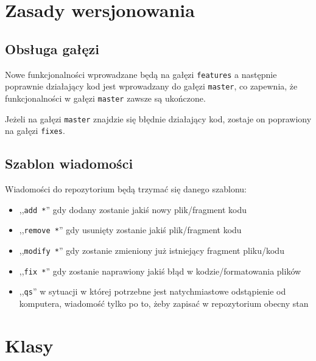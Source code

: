 \documentclass[a4paper,12pt]{report}
\begin{document}
\chapter{Zasady wersjonowania}
\thispagestyle{fancy}

\section{Obsługa gałęzi}
Nowe funkcjonalności wprowadzane będą na gałęzi \verb+features+ a następnie poprawnie działający kod jest wprowadzany do gałęzi \verb+master+, co zapewnia, że funkcjonalności w gałęzi \verb+master+ zawsze są ukończone.

Jeżeli na gałęzi \verb+master+ znajdzie się błędnie działający kod, zostaje on poprawiony na gałęzi \verb+fixes+.

\section{Szablon wiadomości}
Wiadomości do repozytorium będą trzymać się danego szablonu:
\begin{itemize}
    \item ,,\verb+add *+'' gdy dodany zostanie jakiś nowy plik/fragment kodu
    \item ,,\verb+remove *+'' gdy usunięty zostanie jakiś plik/fragment kodu
    \item ,,\verb+modify *+'' gdy zostanie zmieniony już istniejący fragment pliku/kodu
    \item ,,\verb+fix *+'' gdy zostanie naprawiony jakiś błąd w kodzie/formatowania plików
    \item ,,\verb+qs+'' w sytuacji w której potrzebne jest natychmiastowe odstąpienie od komputera, wiadomość tylko po to, żeby zapisać w repozytorium obecny stan
\end{itemize}

\chapter{Klasy}
\pagestyle{fancy}
\end{document}
